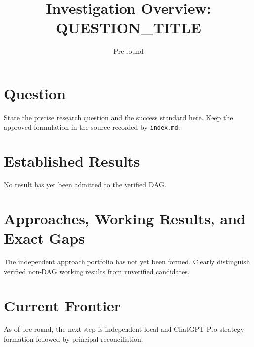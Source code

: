 \documentclass[11pt]{article}
\title{Investigation Overview: {{QUESTION_TITLE}}}
\author{}
\date{Pre-round}
\begin{document}
\maketitle


\section{Question}

State the precise research question and the success standard here. Keep the
approved formulation in the source recorded by \texttt{index.md}.

\section{Established Results}

No result has yet been admitted to the verified DAG.

\section{Approaches, Working Results, and Exact Gaps}

The independent approach portfolio has not yet been formed. Clearly distinguish
verified non-DAG working results from unverified candidates.

\section{Current Frontier}

As of pre-round, the next step is independent local and ChatGPT Pro strategy
formation followed by principal reconciliation.
\end{document}
